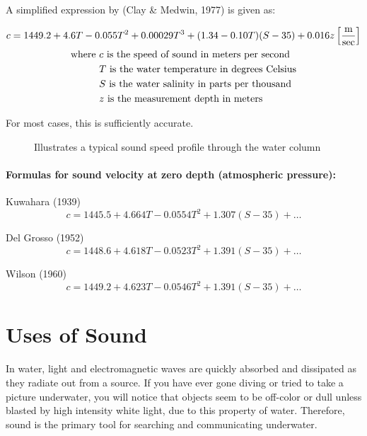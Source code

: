     A simplified expression by (Clay \& Medwin, 1977) is given as:
    
    \begin{gather} \labeq{speed_of_sound_ocean_1}
        c = 1449.2 + 4.6T - 0.055T^2 + 0.00029T^3 + (1.34-0.10T)(S-35) + 0.016z \left[\frac{\text{m}}{\text{sec}}\right] \\    
        \begin{aligned}
            \text{where }   &c \text{ is the speed of sound in meters per second} \\
                            &T \text{ is the water temperature in degrees Celsius} \\
                            &S \text{ is the water salinity in parts per thousand} \\
                            &z \text{ is the measurement depth in meters}
        \end{aligned} \notag
    \end{gather}

    For most cases, this is sufficiently accurate.

    \begin{figure}
        \caption{Illustrates a typical sound speed profile through the water column}
    \end{figure}

    \paragraph*{Formulas for sound velocity at zero depth (atmospheric pressure):}
    Kuwahara (1939) 
    \begin{equation*}
        c = 1445.5+4.664T - 0.0554T^2 + 1.307(S-35)+\dots
    \end{equation*}

    Del Grosso (1952)
    \begin{equation*}
        c = 1448.6 + 4.618T - 0.0523T^2 + 1.391(S-35) + \dots
    \end{equation*}

    Wilson (1960)
    \begin{equation*}
        c = 1449.2 + 4.623T - 0.0546T^2 + 1.391(S-35) + \dots
    \end{equation*}

\section{Uses of Sound}
In water, light and electromagnetic waves are quickly absorbed and dissipated as they radiate out from a source.
If you have ever gone diving or tried to take a picture underwater, you will notice that objects seem to be off-color or dull unless blasted by high intensity white light, due to this property of water.
Therefore, sound is the primary tool for searching and communicating underwater.

